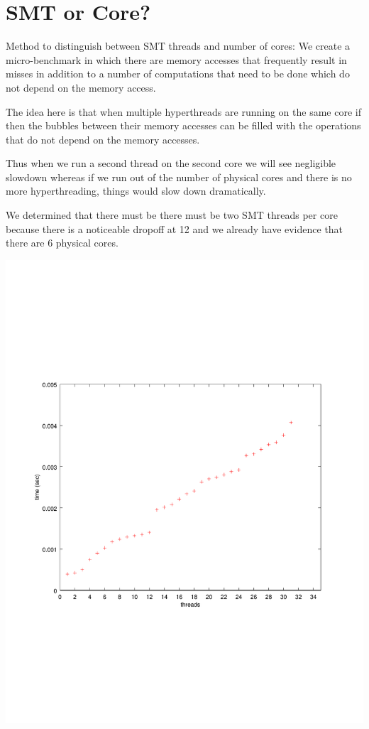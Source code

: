 \documentclass[10pt]{article}
\begin{document}
\section*{SMT or Core?}
Method to distinguish between SMT threads and number of cores:
We create a micro-benchmark in which there are memory accesses that frequently
result in misses in addition to a number of computations that need to be done
which do not depend on the memory access.

The idea here is that when multiple hyperthreads are running on the same core if
then the bubbles between their memory accesses can be filled with the
operations that do not depend on the memory accesses.

Thus when we run a second thread on the second core we will see negligible
slowdown whereas if we run out of the number of physical cores and there is no
more hyperthreading, things would slow down dramatically.

We determined that there must be there must be two SMT threads per core because
there is a noticeable dropoff at 12 and we already have evidence that there are
6 physical cores.

\begin{center}
\includegraphics[scale=0.50]{images/smt}
\end{center}
\end{document}
